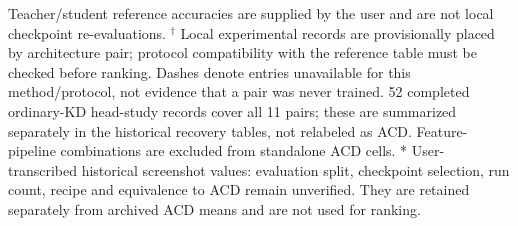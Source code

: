 \begin{table}[t]
\begin{minipage}{0.96\textwidth}
Teacher/student reference accuracies are supplied by the user and are not local checkpoint re-evaluations. $^{\dagger}$ Local experimental records are provisionally placed by architecture pair; protocol compatibility with the reference table must be checked before ranking. Dashes denote entries unavailable for this method/protocol, not evidence that a pair was never trained. 52 completed ordinary-KD head-study records cover all 11 pairs; these are summarized separately in the historical recovery tables, not relabeled as ACD. Feature-pipeline combinations are excluded from standalone ACD cells. * User-transcribed historical screenshot values: evaluation split, checkpoint selection, run count, recipe and equivalence to ACD remain unverified. They are retained separately from archived ACD means and are not used for ranking.
\end{minipage}
\end{table}

